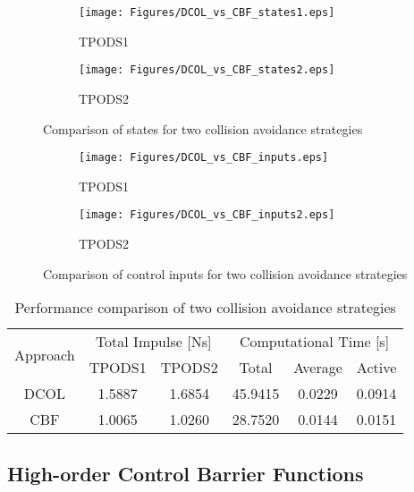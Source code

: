 \begin{figure}[!b]
\begin{subfigure}[b]{0.49\textwidth}
    \centering
    \centerline{\texttt{[image: Figures/DCOL\_vs\_CBF\_states1.eps]}}
    \caption{TPODS1}
\end{subfigure}
\begin{subfigure}[b]{0.49\textwidth}
    \centering
    \centerline{\texttt{[image: Figures/DCOL\_vs\_CBF\_states2.eps]}}
    \caption{TPODS2}
\end{subfigure}
\caption{Comparison of states for two collision avoidance strategies}
\label{fig:DCOL_vs_CBF_sates}
\end{figure}

\begin{figure}[!h]
\begin{subfigure}[b]{\textwidth}
    \centering
    \centerline{\texttt{[image: Figures/DCOL\_vs\_CBF\_inputs.eps]}}
    \caption{TPODS1}
\end{subfigure}
\begin{subfigure}[b]{\textwidth}
    \centering
    \centerline{\texttt{[image: Figures/DCOL\_vs\_CBF\_inputs2.eps]}}
    \caption{TPODS2}
\end{subfigure}
\caption{Comparison of control inputs for two collision avoidance strategies}
\label{fig:DCOL_vs_CBF_inputs}
\end{figure}


\begin{table}
    \centering
    \begin{tabular}{|c|c|c|c|c|c|}
        \hline
        \multirow{2}{*}{Approach} & \multicolumn{2}{|c|}{Total Impulse [Ns]} & \multicolumn{3}{|c|}{Computational Time [s]} \\
        \cline{2-6}
        & TPODS1 & TPODS2 & Total & Average & Active \\
        \hline
        DCOL & 1.5887 & 1.6854 & 45.9415 & 0.0229 & 0.0914\\
        \hline
        CBF & 1.0065 & 1.0260 & 28.7520 & 0.0144 & 0.0151\\
        \hline
    \end{tabular}
    \caption{Performance comparison of two collision avoidance strategies}
    \label{tab:planar_compare}
\end{table}

\subsection{High-order Control Barrier Functions} \label{sec:HOCBF}

